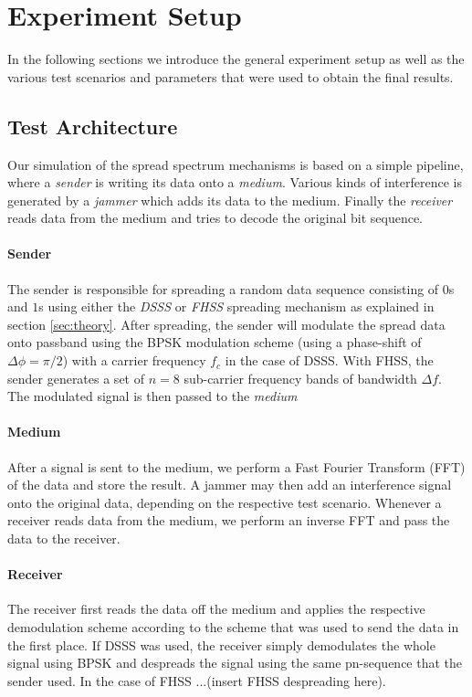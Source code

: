 \section{Experiment Setup}

	In the following sections we introduce the general experiment setup as well as the various test scenarios and parameters that were used to obtain the final results.
	
	\subsection{Test Architecture}
	Our simulation of the spread spectrum mechanisms is based on a simple pipeline, where a \emph{sender} is writing its data onto a \emph{medium}. Various kinds of interference is generated by a \emph{jammer} which adds its data to the medium. Finally the \emph{receiver} reads data from the medium and tries to decode the original bit sequence.
	
	\paragraph{Sender}
	The sender is responsible for spreading a random data sequence consisting of $0$s and $1$s using either the \emph{DSSS} or \emph{FHSS} spreading mechanism as explained in section \ref{sec:theory}. After spreading, the sender will modulate the spread data onto passband using the BPSK modulation scheme (using a phase-shift of $\Delta \phi = \pi / 2$) with a carrier frequency $f_c$ in the case of DSSS. With FHSS, the sender generates a set of $n=8$ sub-carrier frequency bands of bandwidth $\Delta f$. The modulated signal is then passed to the \emph{medium}
	
	\paragraph{Medium} 
	After a signal is sent to the medium, we perform a Fast Fourier Transform (FFT) of the data and store the result. A jammer may then add an interference signal onto the original data, depending on the respective test scenario. Whenever a receiver reads data from the medium, we perform an inverse FFT and pass the data to the receiver.
	
	\paragraph{Receiver}
	The receiver first reads the data off the medium and applies the respective demodulation scheme according to the scheme that was used to send the data in the first place. If DSSS was used, the receiver simply demodulates the whole signal using BPSK and despreads the signal using the same pn-sequence that the sender used. In the case of FHSS ...(insert FHSS despreading here).
		

